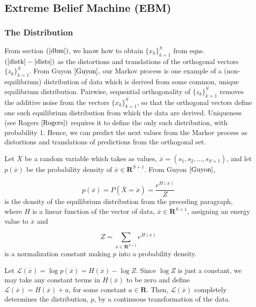 \documentclass[11pt]{imsart}
\begin{document}
\subsection{Extreme Belief Machine (EBM)}

\subsubsection{The Distribution}
\label{dist}

From section $(\ref{dbm})$, we know how to obtain $\{x_{k}\}_{k=1}^{S}$ from eqns. $(\ref{distk}-\ref{dists})$ as the distortions and translations of the orthogonal vectors $\{z_{k}\}_{k=1}^{S}$.  From Guyon $\cite[Sections\ (2.1.1-2.1.3)]{Guyon}$, our Markov process is one example of a (non-equilibrium) distribution of data which is derived from some common, unique equilibrium distribution.  Pairwise, sequential orthogonality of $\{z_{k}\}_{k=1}^{S}$ removes the additive noise from the vectors $\{x_{k}\}_{k=1}^{S}$, so that the orthogonal vectors define one such equilibrium distribution from which the data are derived.  Uniqueness (see Rogers $\cite[Section\ (I.6),\ pg.\ (13)]{Rogers})$ requires it to define the only such distribution, with probability $1$.  Hence, we can predict the next values from the Markov process as distortions and translations of predictions from the orthogonal set.

Let $\overline{X}$ be a random variable which takes as values, $\overline{x}=(s_{1},s_{2},...,s_{S+1})$, and let $p(\overline{x})$ be the probability density of $\overline{x} \in \mathbf{R}^{S+1}$.  From Guyon $\cite[Sections\ (2.1.1-2.1.3)]{Guyon}$,

\begin{equation}
p(\overline{x}) = P(\overline{X}=\overline{x}) = \frac{e^{H(\overline{x})}}{Z}
\end{equation}
is the density of the equilibrium distribution from the preceding paragraph, where $H$ is a linear function of the vector of data, $\overline{x} \in \mathbf{R}^{S+1}$, assigning an energy value to $\overline{x}$ and

\begin{equation}
Z = \sum_{\overline{x} \in \mathbf{R}^{S+1}} e^{H(\overline{x})}
\end{equation}
is a normalization constant making $p$ into a probability density.

Let $\mathcal{L}(\overline{x}) = \log{p(\overline{x})} = H(\overline{x})-\log{Z}$.  Since $\log{Z}$ is just a constant, we may take any constant terms in $H(\overline{x})$ to be zero and define $\mathcal{L}(\overline{x}) = H(\overline{x})+a$, for some constant $a \in \mathbf{R}$.  Then, $\mathcal{L}(\overline{x})$ completely determines the distribution, $p$, by a continuous transformation of the data.
\end{document}
